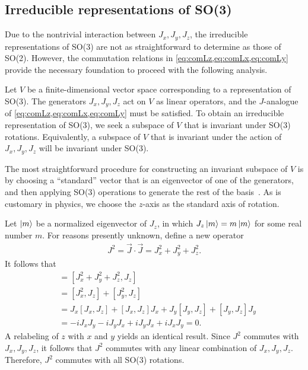     \subsection{Irreducible representations of SO(3)}
    Due to the nontrivial interaction between $J_x,J_y,J_z$, the irreducible representations of SO(3) are not as straightforward to determine as those of SO(2). However, the commutation relations in \cref{eq:comLz,eq:comLx,eq:comLy} provide the necessary foundation to proceed with the following analysis.

    Let $V$ be a finite-dimensional vector space corresponding to a representation of SO(3). The generators $J_x,J_y,J_z$ act on $V$ as linear operators, and the $J$-analogue of \cref{eq:comLz,eq:comLx,eq:comLy} must be satisfied. To obtain an irreducible representation of SO(3), we seek a subspace of $V$ that is invariant under SO(3) rotations. Equivalently, a subspace of $V$ that is invariant under the action of $J_x,J_y,J_z$ will be invariant under SO(3).

    The most straightforward procedure for constructing an invariant subspace of $V$ is by choosing a ``standard'' vector that is an eigenvector of one of the generators, and then applying SO(3) operations to generate the rest of the basis~\cite{Tung1985}. As is customary in physics, we choose the $z$-axis as the standard axis of rotation.

    Let $\ket{m}$ be a normalized eigenvector of $J_z$, in which $J_z\ket{m} = m\ket{m}$ for some real number $m$. For reasons presently unknown, define a new operator
    \begin{align*}
        J^2 = \vec{J}\cdot\vec{J} = J_x^2 + J_y^2 + J_z^2.
    \end{align*}
    It follows that
    \begin{align*}
        [J^2,J_z] 
            &= [J_x^2 + J_y^2 + J_z^2, J_z] \\
            &= [J_x^2,J_z] + [J_y^2,J_z] \\
            &= J_x [J_x,J_z] + [J_x,J_z]J_x + J_y [J_y,J_z] + [J_y,J_z]J_y \\
            &= -i J_x J_y -i J_y J_x + i J_y J_x + i J_x J_y = 0.
    \end{align*}
    A relabeling of $z$ with $x$ and $y$ yields an identical result. Since $J^2$ commutes with $J_x,J_y,J_z$, it follows that $J^2$ commutes with any linear combination of $J_x,J_y,J_z$. Therefore, $J^2$ commutes with all SO(3) rotations.

